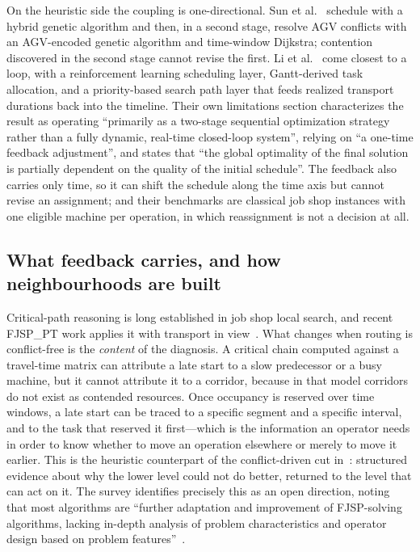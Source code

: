 \documentclass[manuscript,screen,review]{acmart}
\begin{document}
On the heuristic side the coupling is one-directional. Sun et
al.~\cite{sun2023integrated} schedule with a hybrid genetic algorithm and then,
in a second stage, resolve AGV conflicts with an AGV-encoded genetic algorithm
and time-window Dijkstra; contention discovered in the second stage cannot revise
the first. Li et al.~\cite{li2026framework} come closest to a loop, with a
reinforcement learning scheduling layer, Gantt-derived task allocation, and a
priority-based search path layer that feeds realized transport durations back
into the timeline. Their own limitations section characterizes the result as
operating ``primarily as a two-stage sequential optimization strategy rather than
a fully dynamic, real-time closed-loop system'', relying on ``a one-time feedback
adjustment'', and states that ``the global optimality of the final solution is
partially dependent on the quality of the initial schedule''. The feedback also
carries only time, so it can shift the schedule
along the time axis but cannot revise an assignment; and their benchmarks are
classical job shop instances with one eligible machine per operation, in which
reassignment is not a decision at all.

\subsection{What feedback carries, and how neighbourhoods are built}

Critical-path reasoning is long established in job shop local search, and recent
FJSP\_PT work applies it with transport in view~\cite{qin2026knowledge}. What
changes when routing is conflict-free is the \emph{content} of the diagnosis. A
critical chain computed against a travel-time matrix can attribute a late start
to a slow predecessor or a busy machine, but it cannot attribute it to a corridor,
because in that model corridors do not exist as contended resources. Once
occupancy is reserved over time windows, a late start can be traced to a specific
segment and a specific interval, and to the task that reserved it first---which is
the information an operator needs in order to know whether to move an operation
elsewhere or merely to move it earlier. This is the heuristic counterpart of the
conflict-driven cut in~\cite{vanos2026exact}: structured evidence about why the
lower level could not do better, returned to the level that can act on it. The
survey identifies precisely this as an open direction, noting that most
algorithms are ``further adaptation and improvement of FJSP-solving algorithms,
lacking in-depth analysis of problem characteristics and operator design based on
problem features''~\cite{xin2025review}.
\end{document}
